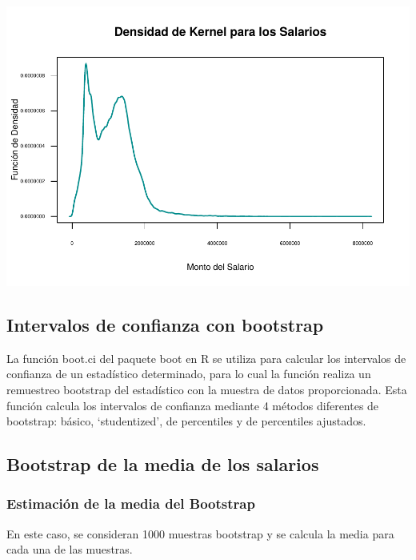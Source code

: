\documentclass[
]{article}
\begin{document}
\includegraphics{Tarea1_files/figure-latex/unnamed-chunk-35-1.pdf}

\hypertarget{intervalos-de-confianza-con-bootstrap}{%
\subsection{Intervalos de confianza con
bootstrap}\label{intervalos-de-confianza-con-bootstrap}}

La función boot.ci del paquete boot en R se utiliza para calcular los
intervalos de confianza de un estadístico determinado, para lo cual la
función realiza un remuestreo bootstrap del estadístico con la muestra
de datos proporcionada. Esta función calcula los intervalos de confianza
mediante 4 métodos diferentes de bootstrap: básico, `studentized', de
percentiles y de percentiles ajustados.

\hypertarget{bootstrap-de-la-media-de-los-salarios}{%
\subsection{Bootstrap de la media de los
salarios}\label{bootstrap-de-la-media-de-los-salarios}}

\hypertarget{estimaciuxf3n-de-la-media-del-bootstrap}{%
\subsubsection{Estimación de la media del
Bootstrap}\label{estimaciuxf3n-de-la-media-del-bootstrap}}

En este caso, se consideran 1000 muestras bootstrap y se calcula la
media para cada una de las muestras.
\end{document}

